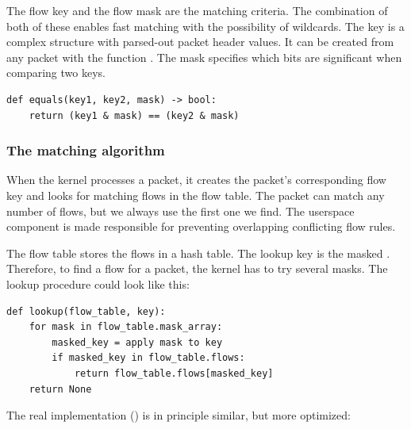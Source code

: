 The flow key and the flow mask are the matching criteria. The combination of both of these enables fast matching with the possibility of wildcards. The key is a complex structure with parsed-out packet header values. It can be created from any packet with the function \href{https://elixir.bootlin.com/linux/v6.2.6/source/net/openvswitch/flow.c\#L886}{}. The mask specifies which bits are significant when comparing two keys.

\begin{verbatim}
def equals(key1, key2, mask) -> bool:
    return (key1 & mask) == (key2 & mask)
\end{verbatim}


\subsubsection{The matching algorithm}
\label{the-matching-algorithm}

When the kernel processes a packet, it creates the packet's corresponding flow key and looks for matching flows in the flow table. The packet can match any number of flows, but we always use the first one we find. The userspace component is made responsible for preventing overlapping conflicting flow rules.

The flow table stores the flows in a hash table. The lookup key is the masked . Therefore, to find a flow for a packet, the kernel has to try several masks. The lookup procedure could look like this:

\begin{verbatim}
def lookup(flow_table, key):
    for mask in flow_table.mask_array:
        masked_key = apply mask to key
        if masked_key in flow_table.flows:
            return flow_table.flows[masked_key]
    return None
\end{verbatim}
    

The real implementation (\href{https://elixir.bootlin.com/linux/v6.2.5/source/net/openvswitch/flow_table.c\#L785}{}) is in principle similar, but more optimized:

